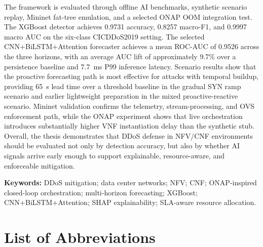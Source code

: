 \documentclass[12pt, a4paper, reqno, oneside]{book}
\begin{document}
The framework is evaluated through offline AI benchmarks, synthetic scenario
replay, Mininet fat-tree emulation, and a selected ONAP OOM integration test.
The XGBoost detector achieves 0.9731 accuracy, 0.8257 macro-F1, and 0.9997
macro AUC on the six-class CICDDoS2019 setting. The selected
CNN+BiLSTM+Attention forecaster achieves a mean ROC-AUC of 0.9526 across the
three horizons, with an average AUC lift of approximately 9.7\% over a
persistence baseline and 7.7~ms P99 inference latency. Scenario results show
that the proactive forecasting path is most effective for attacks with temporal
buildup, providing 65~s lead time over a threshold baseline in the gradual SYN
ramp scenario and earlier lightweight preparation in the mixed
proactive-reactive scenario. Mininet validation confirms the telemetry,
stream-processing, and OVS enforcement path, while the ONAP experiment shows
that live orchestration introduces substantially higher VNF instantiation delay
than the synthetic stub. Overall, the thesis demonstrates that DDoS defense in
NFV/CNF environments should be evaluated not only by detection accuracy, but
also by whether AI signals arrive early enough to support explainable,
resource-aware, and enforceable mitigation.

\vspace{10pt}
\noindent\textbf{Keywords:} DDoS mitigation; data center networks; NFV; CNF;
ONAP-inspired closed-loop orchestration; multi-horizon forecasting; XGBoost;
CNN+BiLSTM+Attention; SHAP explainability; SLA-aware resource allocation.

\newpage

\chapter*{List of Abbreviations}
\vspace{10pt}
\end{document}
